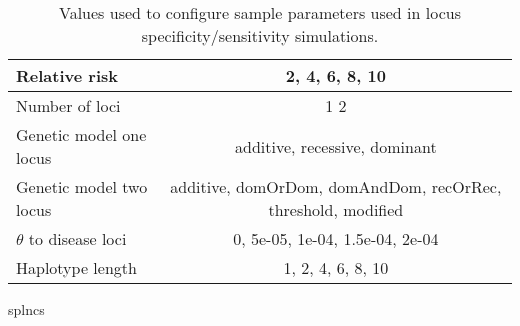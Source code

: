 \documentclass[runningheads]{llncs}
\begin{document}
\begin{table}[hb] 
\centering 

\caption{Values used to configure sample parameters used in locus specificity/sensitivity simulations.}
\begin{tabular}{|l|c|}
\hline
Relative risk & 2, 4, 6, 8, 10 \\
\hline
Number of loci & 1 2 \\
\hline
Genetic model one locus & additive, recessive, dominant \\
\hline
Genetic model two locus & additive, domOrDom, domAndDom, recOrRec, threshold, modified \\
\hline
$\theta$ to disease loci & 0, 5e-05,  1e-04, 1.5e-04, 2e-04\\
\hline
Haplotype length & 1, 2, 4, 6, 8, 10 \\
\hline
\end{tabular}
\label  {tab:Sconfigurations}
\end{table} 



 {splncs}  %

\end{document}
